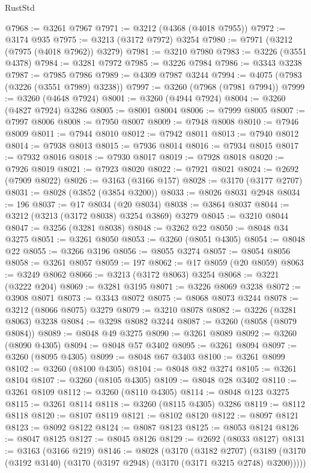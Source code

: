 \begin{lexlean}{RustStd}
\begin{coremodule}
@7968 := @3261 @7967
@7971 := @3212 (@4368 (@4018 @7955))
@7972 := @3174 @935
@7975 := @3213 (@3172 @7972) @3254
@7980 := @7971 (@3212 (@7975 (@4018 @7962)) @3279)
@7981 := @3210 @7980
@7983 := @3226 (@3551 @4378)
@7984 := @3281 @7972
@7985 := @3226 @7984
@7986 := @3343 @3238
@7987 := @7985 @7986
@7989 := @4309 @7987 @3244
@7994 := @4075 (@7983 (@3226 (@3551 @7989) @3238))
@7997 := @3260 (@7968 (@7981 @7994))
@7999 := @3260 (@4648 @7924)
@8001 := @3260 (@4944 @7924)
@8004 := @3260 (@4827 @7924) @3286
@8005 := @8001 @8004
@8006 := @7999 @8005
@8007 := @7997 @8006
@8008 := @7950 @8007
@8009 := @7948 @8008
@8010 := @7946 @8009
@8011 := @7944 @8010
@8012 := @7942 @8011
@8013 := @7940 @8012
@8014 := @7938 @8013
@8015 := @7936 @8014
@8016 := @7934 @8015
@8017 := @7932 @8016
@8018 := @7930 @8017
@8019 := @7928 @8018
@8020 := @7926 @8019
@8021 := @7923 @8020
@8022 := @7921 @8021
@8024 := @2692 (@7909 @8022)
@8026 := @3163 (@3166 @157)
@8028 := @3170 (@3177 @2707)
@8031 := @8028 (@3852 (@3854 @3200))
@8033 := @8026 @8031 @2948
@8034 := 196
@8037 := @17 @8034 (@20 @8034)
@8038 := @3864 @8037
@8044 := @3212 (@3213 (@3172 @8038) @3254 @3869) @3279
@8045 := @3210 @8044
@8047 := @3256 (@3281 @8038)
@8048 := @3262 @22
@8050 := @8048 @34 @3275
@8051 := @3261 @8050
@8053 := @3260 (@8051 @4305)
@8054 := @8048 @22
@8055 := @3266 @3196
@8056 := @8055 @3274
@8057 := @8054 @8056
@8058 := @3261 @8057
@8059 := 197
@8062 := @17 @8059 (@20 @8059)
@8063 := @3249 @8062
@8066 := @3213 (@3172 @8063) @3254
@8068 := @3221 (@3222 @204)
@8069 := @3281 @3195
@8071 := @3226 @8069 @3238
@8072 := @3908 @8071
@8073 := @3343 @8072
@8075 := @8068 @8073 @3244
@8078 := @3212 (@8066 @8075) @3279
@8079 := @3210 @8078
@8082 := @3226 (@3281 @8063) @3238
@8084 := @3298 @8082 @3244
@8087 := @3260 (@8058 (@8079 @8084))
@8089 := @8048 @49 @3275
@8090 := @3261 @8089
@8092 := @3260 (@8090 @4305)
@8094 := @8048 @57 @3402
@8095 := @3261 @8094
@8097 := @3260 (@8095 @4305)
@8099 := @8048 @67 @3403
@8100 := @3261 @8099
@8102 := @3260 (@8100 @4305)
@8104 := @8048 @82 @3274
@8105 := @3261 @8104
@8107 := @3260 (@8105 @4305)
@8109 := @8048 @28 @3402
@8110 := @3261 @8109
@8112 := @3260 (@8110 @4305)
@8114 := @8048 @123 @3275
@8115 := @3261 @8114
@8118 := @3260 (@8115 @4305) @3286
@8119 := @8112 @8118
@8120 := @8107 @8119
@8121 := @8102 @8120
@8122 := @8097 @8121
@8123 := @8092 @8122
@8124 := @8087 @8123
@8125 := @8053 @8124
@8126 := @8047 @8125
@8127 := @8045 @8126
@8129 := @2692 (@8033 @8127)
@8131 := @3163 (@3166 @219)
@8146 := @8028
    (@3170
      (@3182 @2707)
      (@3189 (@3170 (@3192 @3140) (@3170 (@3197 @2948) (@3170 (@3171 @3215 @2748) @3200)))))

\end{coremodule}
\end{lexlean}
